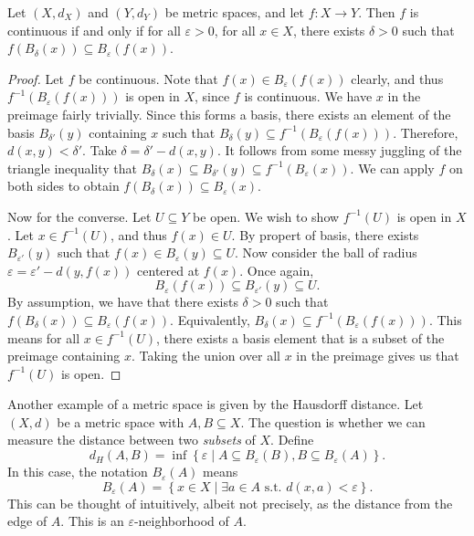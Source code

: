 \begin{theorem}\label{thm:3.1}
	Let $(X,d_X)$ and $(Y,d_Y)$ be metric spaces, and let $f : X \to Y$. Then $f$ is continuous if and only if for all $\varepsilon >0$, for all $x\in X$, there exists $\delta >0$ such that $f(B_{\delta } (x))\subseteq B_{\varepsilon } (f(x))$.
\end{theorem}
\begin{proof}
	Let $f$ be continuous. Note that $f(x)\in B_\varepsilon  (f(x))$ clearly, and thus $f^{-1} (B_{\varepsilon } (f(x)))$ is open in $X$, since $f$ is continuous. We have $x$ in the preimage fairly trivially. Since this forms a basis, there exists an element of the basis $B_{\delta '}  (y)$ containing $x$ such that $B_\delta (y)\subseteq f^{-1} (B_\varepsilon (f(x)))$. Therefore, $d(x,y)<\delta '$. Take $\delta =\delta '-d(x,y)$. It follows from some messy juggling of the triangle inequality that $B_{\delta } (x)\subseteq B_{\delta '} (y)\subseteq f^{-1} (B_\varepsilon (x))$. We can apply $f$ on both sides to obtain $f(B_\delta (x))\subseteq B_\varepsilon (x)$.

	Now for the converse. Let $U\subseteq Y$ be open. We wish to show $f^{-1} (U)$ is open in $X$. Let $x\in f^{-1} (U)$, and thus $f(x)\in U$. By propert of basis, there exists $B_{\varepsilon '} (y)$ such that $f(x)\in B_{\varepsilon } (y)\subseteq U$. Now consider the ball of radius $\varepsilon =\varepsilon '-d(y,f(x))$ centered at $f(x)$. Once again,
	\[
		B_{\varepsilon } (f(x))\subseteq B_{\varepsilon' } (y)\subseteq U
	.\]
	By assumption, we have that there exists $\delta >0$ such that $f(B_\delta (x))\subseteq B_\varepsilon (f(x))$. Equivalently, $B_\delta (x)\subseteq f^{-1} (B_{\varepsilon } (f(x)))$. This means for all $x\in f^{-1} (U)$, there exists a basis element that is a subset of the preimage containing $x$. Taking the union over all $x$ in the preimage gives us that $f^{-1} (U)$ is open.
\end{proof}

Another example of a metric space is given by the Hausdorff distance. Let $(X,d)$ be a metric space with $A,B\subseteq X$. The question is whether we can measure the distance between two \emph{subsets} of $X$. Define
\[
	d_H(A,B)=\inf \left\{ \varepsilon \mid A\subseteq B_{\varepsilon} (B),B\subseteq B_{\varepsilon } (A) \right\} 
.\]
In this case, the notation $B_{\varepsilon } (A)$ means
\[
	B_{\varepsilon } (A)=\left\{ x\in X\mid \exists a\in A\text{ s.t. } d(x,a)<\varepsilon  \right\} 
.\]
This can be thought of intuitively, albeit not precisely, as the distance from the edge of $A$. This is an $\varepsilon $-neighborhood of $A$.
